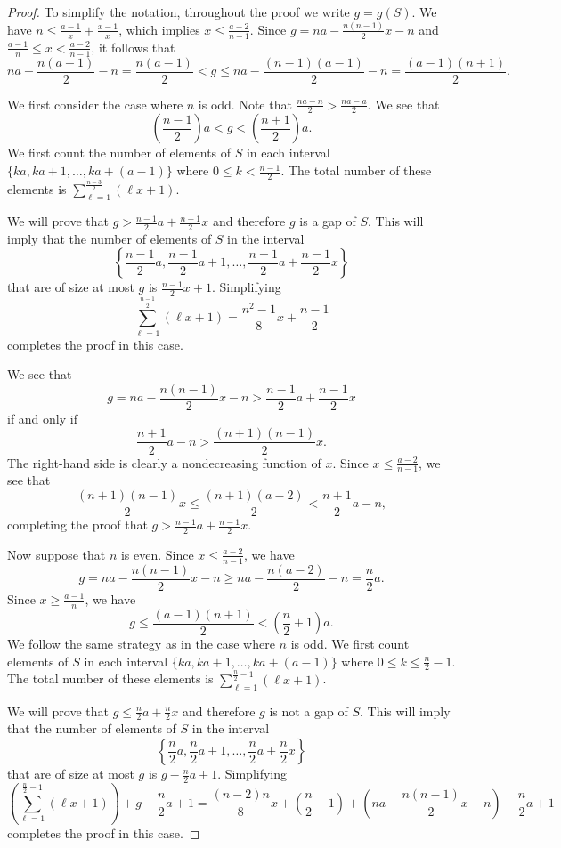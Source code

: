 \documentclass[12pt]{amsart}
\theoremstyle{plain}\newtheorem{proposition}{Proposition}[section]
\begin{document}
\begin{proof}
To simplify the notation, throughout the proof we write $g = g(S)$.  We have $n \le \frac{a-1}{x} + \frac{x-1}{x}$, which implies $x \le \frac{a-2}{n-1}$.  Since $g= na-\frac{n(n-1)}{2}x-n$ and $\frac{a-1}{n}\leq x < \frac{a-2}{n-1}$, it follows that 
\[
na-\frac{n(a-1)}{2}-n = \frac{n(a-1)}{2}<g \leq na-\frac{(n-1)(a-1)}{2}-n= \frac{(a-1)(n+1)}{2}.
\]

We first consider the case where $n$ is odd.  Note that $\frac{na-n}{2}>\frac{na-a}{2}$.  We see that 
\[
\left(\frac{n-1}{2} \right) a < g < \left(\frac{n+1}{2}\right) a.
\]
We first count the number of elements of $S$ in each interval $\{ka,ka+1,\ldots, ka+(a-1)\}$ where $0 \le k < \frac{n-1}{2}$.  The total number of these elements is $\sum\limits_{\ell=1}^{\frac{n-3}{2}}(\ell x+1)$.  

We will prove that $g > \frac{n-1}{2} a + \frac{n-1}{2} x$ and therefore $g$ is a gap of $S$.  This will imply that the number of elements of $S$ in the interval 
\[
\left\{\frac{n-1}{2} a, \frac{n-1}{2} a +1,\ldots, \frac{n-1}{2} a + \frac{n-1}{2} x\right\}
\]
that are of size at most $g$ is $\frac{n-1}{2} x +1$.  Simplifying 
\[
\sum\limits_{\ell=1}^{\frac{n-1}{2}}(\ell x+1) = \frac{n^2-1}{8} x + \frac{n-1}{2} 
\]
completes the proof in this case.

We see that 
\[
g = na - \frac{n(n-1)}{2} x - n > \frac{n-1}{2} a + \frac{n-1}{2} x 
\]
if and only if 
\[
\frac{n+1}{2} a - n > \frac{(n+1)(n-1)}{2} x.
\]
The right-hand side is clearly a nondecreasing function of $x$.  Since $x \le \frac{a-2}{n-1}$, we see that 
\[
\frac{(n+1)(n-1)}{2} x \le \frac{(n+1)(a-2)}{2} < \frac{n+1}{2} a - n,
\]
completing the proof that $g > \frac{n-1}{2} a + \frac{n-1}{2} x$.


Now suppose that $n$ is even.   Since $x \le \frac{a-2}{n-1}$, we have
\[
g = na - \frac{n(n-1)}{2} x - n \ge na - \frac{n(a-2)}{2} - n = \frac{n}{2} a.
\]
Since $x \ge \frac{a-1}{n}$, we have
\[
g \le \frac{(a-1)(n+1)}{2} < \left(\frac{n}{2}+1\right) a. 
\]
We follow the same strategy as in the case where $n$ is odd.  We first count elements of $S$ in each interval $\{ka,ka+1,\ldots, ka+(a-1)\}$ where $0 \le k \le \frac{n}{2}-1$.  The total number of these elements is $\sum\limits_{\ell=1}^{\frac{n}{2}-1}(\ell x+1)$.  

We will prove that $g \le \frac{n}{2} a + \frac{n}{2} x$ and therefore $g$ is not a gap of $S$. This will imply that the number of elements of $S$ in the interval 
\[
\left\{\frac{n}{2} a, \frac{n}{2} a +1,\ldots, \frac{n}{2} a + \frac{n}{2} x\right\}
\]
that are of size at most $g$ is $g - \frac{n}{2} a + 1$.  Simplifying 
\[
\left(\sum\limits_{\ell=1}^{\frac{n}{2}-1}(\ell x+1) \right)+ g - \frac{n}{2} a + 1
=
\frac{(n-2)n}{8} x + \left(\frac{n}{2}-1\right) + \left(na-\frac{n(n-1)}{2} x - n\right) - \frac{n}{2} a + 1
\]
completes the proof in this case.


\end{proof}
\end{document}
